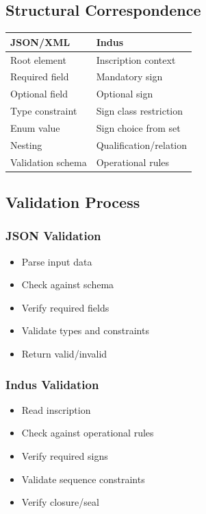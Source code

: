 \subsection{Structural Correspondence}

\begin{center}
\begin{tabular}{ll}
JSON/XML & Indus \\
\hline
Root element & Inscription context \\
Required field & Mandatory sign \\
Optional field & Optional sign \\
Type constraint & Sign class restriction \\
Enum value & Sign choice from set \\
Nesting & Qualification/relation \\
Validation schema & Operational rules \\
\end{tabular}
\end{center}

\subsection{Validation Process}

\subsubsection{JSON Validation}
\begin{itemize}
    \item Parse input data
    \item Check against schema
    \item Verify required fields
    \item Validate types and constraints
    \item Return valid/invalid
\end{itemize}

\subsubsection{Indus Validation}
\begin{itemize}
    \item Read inscription
    \item Check against operational rules
    \item Verify required signs
    \item Validate sequence constraints
    \item Verify closure/seal
\end{itemize}

